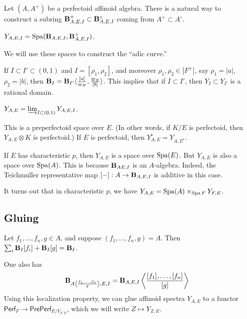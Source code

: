 Let $(A,A^+)$ be a perfectoid affinoid algebra. There is a natural way to construct 
a subring $\mathbf{B}_{A,E,I}^+\subset \mathbf{B}_{A,E,I}^\circ$ coming from 
$A^+\subset A^\circ$. 

\begin{definition}
$Y_{A,E,I}=\operatorname{Spa}(\mathbf{B}_{A,E,I},\mathbf{B}_{A,E,I}^+)$. 
\end{definition}

We will use these spaces to construct the ``adic curve.'' 

If $I\subset I'\subset (0,1)$ and $I=[\rho_1,\rho_2]$, and moreover 
$\rho_1,\rho_2\in |F^\times|$, say $\rho_1=|a|$, $\rho_2=|b|$, then 
$\mathbf{B}_I=\mathbf{B}_{I'}\langle \frac{[a]}{\varpi_E},\frac{\varpi_E}{[b]}\rangle$. 
This implies that if $I\subset I'$, then $Y_I\subset Y_{I'}$ is a rational domain. 

\begin{definition}
$Y_{A,E} = \varinjlim_{I\subset (0,1)} Y_{A,E,I}$. 
\end{definition}

This is a preperfectoid space over $E$. (In other words, if $K/E$ is perfectoid, 
then $Y_{A,E}\otimes K$ is perfectoid.) If $E$ is perfectoid, then 
$Y_{A,E}^\flat = Y_{A,E^\flat}$. 

\begin{example}
If $E$ has characteristic $p$, then $Y_{A,E}$ is a space over 
$\operatorname{Spa}(E)$. But $Y_{A,E}$ is also a space over $\operatorname{Spa}(A)$. This is because 
$\mathbf{B}_{AE,I}$ is an $A$-algebra. Indeed, the Teichmuller representative map 
$[-]:A\to \mathbf{B}_{A,E,I}$ is additive in this case. 
\end{example}

It turns out that in characteristic $p$, we have 
$Y_{A,E}=\operatorname{Spa}(A)\times_{\operatorname{Spa} F} Y_{F,E}$. 





\subsection{Gluing}

\begin{proposition}
Let $f_1,\dots,f_n,g\in A$, and suppose $(f_1,\dots,f_n,g)=A$. Then 
$\sum_i \mathbf{B}_I [f_i] + \mathbf{B}_I[g] = \mathbf{B}_I$. 
\end{proposition}

One also has 
\[
  \mathbf{B}_{A\left\langle\frac{f_1,\dots,f_n}{g}\right\rangle,E,I} = \mathbf{B}_{A,E,I} \left\langle \frac{[f_1],\dots,[f_n]}{[g]}\right\rangle 
\]
Using this localization property, we can glue affinoid spectra $Y_{A,E}$ 
to a functor $\mathsf{Perf}_F \to \mathsf{PrePerf}_{E/Y_{F,E}}$, which we will 
write $Z\mapsto Y_{Z,E}$. 

